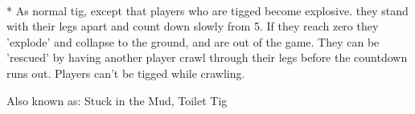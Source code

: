 \begin{minipage}{\textwidth}
\equip{}
\\*
As normal tig, except that players who are tigged become explosive.  they stand with their legs apart and count down slowly from 5.  If they reach zero they 'explode' and collapse to the ground, and are out of the game.  They can be 'rescued' by having another player crawl through their legs before the countdown runs out.  Players can't be tigged while crawling.

Also known as: Stuck in the Mud, Toilet Tig
\end{minipage}    \vfill
